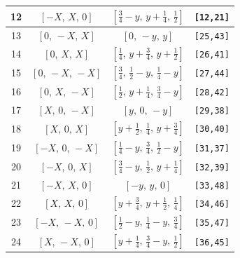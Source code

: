 \documentclass[fleqn,8pt]{jsarticle}
\begin{document}
\begin{longtable}{cccc}
12 & $\left[ - X,\, X,\, 0 \right]$ & $\left[ \frac{3}{4} - y,\, y + \frac{1}{4},\, \frac{1}{2} \right]$ & {\tt [12,21]} \\ \hline
13 & $\left[ 0,\, - X,\, X \right]$ & $\left[ 0,\, - y,\, y \right]$ & {\tt [25,43]} \\ \hline
14 & $\left[ 0,\, X,\, X \right]$ & $\left[ \frac{1}{4},\, y + \frac{3}{4},\, y + \frac{1}{2} \right]$ & {\tt [26,41]} \\ \hline
15 & $\left[ 0,\, - X,\, - X \right]$ & $\left[ \frac{3}{4},\, \frac{1}{2} - y,\, \frac{1}{4} - y \right]$ & {\tt [27,44]} \\ \hline
16 & $\left[ 0,\, X,\, - X \right]$ & $\left[ \frac{1}{2},\, y + \frac{1}{4},\, \frac{3}{4} - y \right]$ & {\tt [28,42]} \\ \hline
17 & $\left[ X,\, 0,\, - X \right]$ & $\left[ y,\, 0,\, - y \right]$ & {\tt [29,38]} \\ \hline
18 & $\left[ X,\, 0,\, X \right]$ & $\left[ y + \frac{1}{2},\, \frac{1}{4},\, y + \frac{3}{4} \right]$ & {\tt [30,40]} \\ \hline
19 & $\left[ - X,\, 0,\, - X \right]$ & $\left[ \frac{1}{4} - y,\, \frac{3}{4},\, \frac{1}{2} - y \right]$ & {\tt [31,37]} \\ \hline
20 & $\left[ - X,\, 0,\, X \right]$ & $\left[ \frac{3}{4} - y,\, \frac{1}{2},\, y + \frac{1}{4} \right]$ & {\tt [32,39]} \\ \hline
21 & $\left[ - X,\, X,\, 0 \right]$ & $\left[ - y,\, y,\, 0 \right]$ & {\tt [33,48]} \\ \hline
22 & $\left[ X,\, X,\, 0 \right]$ & $\left[ y + \frac{3}{4},\, y + \frac{1}{2},\, \frac{1}{4} \right]$ & {\tt [34,46]} \\ \hline
23 & $\left[ - X,\, - X,\, 0 \right]$ & $\left[ \frac{1}{2} - y,\, \frac{1}{4} - y,\, \frac{3}{4} \right]$ & {\tt [35,47]} \\ \hline
24 & $\left[ X,\, - X,\, 0 \right]$ & $\left[ y + \frac{1}{4},\, \frac{3}{4} - y,\, \frac{1}{2} \right]$ & {\tt [36,45]} \\
\end{longtable}
\renewcommand{\arraystretch}{1.2}
\end{document}
